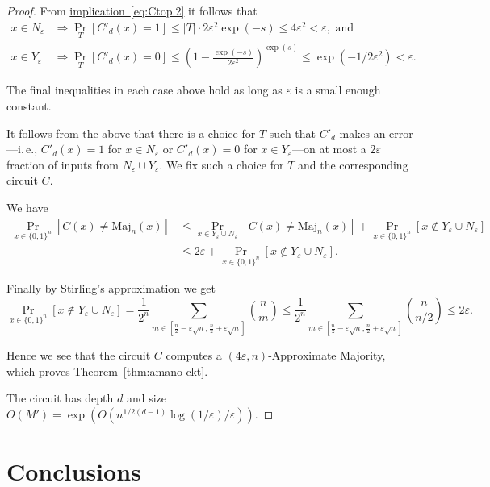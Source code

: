 \documentclass[11pt]{article}
\numberwithin{equation}{section}
\theoremstyle{definition}
\theoremstyle{plain}
\newcommand{\ie}{i.\,e.}
\newcommand{\expref}[2]{\hyperref[#2]{#1~\ref{#2}}}
\newcommand{\expeqref}[2]{\hyperref[#2]{#1~\eqref{#2}}}
\newcommand{\prob}[2]{\mathop{\mathrm{Pr}}_{#1}[#2]}
\begin{document}
\begin{proof}
{}From \expeqref{implication}{eq:Ctop.2} it follows that 
\begin{align*}
x\in N_\varepsilon &\Rightarrow \prob{T}{C'_d(x) = 1}\leq |T|\cdot 2\varepsilon^2\exp(-s) \leq 4\varepsilon^2 < \varepsilon, \text{ and }\\
x\in Y_\varepsilon &\Rightarrow \prob{T}{C'_d(x) = 0}\leq \left(1-\frac{\exp(-s)}{2\varepsilon^2}\right)^{\exp(s)} \leq \exp(-1/2\varepsilon^2) < \varepsilon.
\end{align*}

The final inequalities in each case above hold as long as $\varepsilon$ is a small enough constant. 

It follows from the above that there is a choice for $T$ such that $C'_d$ makes an error---\ie, $C'_d(x) = 1$ for $x\in N_\varepsilon$ or $C'_d(x) = 0$ for $x\in Y_\varepsilon$---on at most a $2\varepsilon$ fraction of inputs from  $N_\varepsilon\cup Y_\varepsilon$. We fix such a choice for $T$ and the corresponding circuit $C$. 

We have 
\begin{align*}
\prob{x\in \{0,1\}^n}{C(x) \neq \mathrm{Maj}_n(x)}&\leq \prob{x\in Y_\varepsilon\cup N_\varepsilon}{C(x) \neq \mathrm{Maj}_n(x)} + \prob{x\in\{0,1\}^n}{x\not\in Y_\varepsilon\cup N_\varepsilon}\\
&\leq 2\varepsilon + \prob{x\in\{0,1\}^n}{x\not\in Y_\varepsilon\cup N_\varepsilon}.
\end{align*}

Finally by Stirling's approximation we get
\[
\prob{x\in\{0,1\}^n}{x\not\in Y_\varepsilon\cup N_\varepsilon} = \frac{1}{2^n}\sum_{m\in [\frac{n}{2}-\varepsilon\sqrt{n}, \frac{n}{2}+\varepsilon\sqrt{n}]}\binom{n}{m} \leq \frac{1}{2^n}\sum_{m\in [\frac{n}{2}-\varepsilon\sqrt{n}, \frac{n}{2}+\varepsilon\sqrt{n}]}\binom{n}{n/2} \leq 2\varepsilon.
\]

Hence we see that the circuit $C$ computes a $(4\varepsilon,n)$-Approximate Majority, which proves \expref{Theorem}{thm:amano-ckt}.

The circuit has depth $d$ and size $O(M') = \exp(O(n^{1/2(d-1)}\log(1/\varepsilon)/\varepsilon))$.
\end{proof}




\section{Conclusions}
\label{sec:conclusion}
\end{document}
